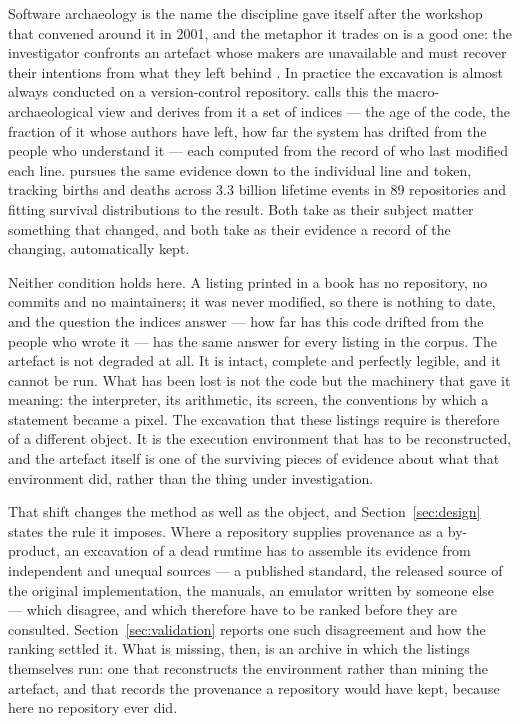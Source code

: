 Software archaeology is the name the discipline gave itself after the workshop that convened around it in 2001, and the metaphor it trades on is a good one: the investigator confronts an artefact whose makers are unavailable and must recover their intentions from what they left behind \citep{huntThomas2002}. In practice the excavation is almost always conducted on a version-control repository. \citet{robles2005} calls this the macro-archaeological view and derives from it a set of indices --- the age of the code, the fraction of it whose authors have left, how far the system has drifted from the people who understand it --- each computed from the record of who last modified each line. \citet{spinellis2021} pursues the same evidence down to the individual line and token, tracking births and deaths across 3.3 billion lifetime events in 89 repositories and fitting survival distributions to the result. Both take as their subject matter something that changed, and both take as their evidence a record of the changing, automatically kept.

Neither condition holds here. A listing printed in a book has no repository, no commits and no maintainers; it was never modified, so there is nothing to date, and the question the indices answer --- how far has this code drifted from the people who wrote it --- has the same answer for every listing in the corpus. The artefact is not degraded at all. It is intact, complete and perfectly legible, and it cannot be run. What has been lost is not the code but the machinery that gave it meaning: the interpreter, its arithmetic, its screen, the conventions by which a statement became a pixel. The excavation that these listings require is therefore of a different object. It is the execution environment that has to be reconstructed, and the artefact itself is one of the surviving pieces of evidence about what that environment did, rather than the thing under investigation.

That shift changes the method as well as the object, and Section~\ref{sec:design} states the rule it imposes. Where a repository supplies provenance as a by-product, an excavation of a dead runtime has to assemble its evidence from independent and unequal sources --- a published standard, the released source of the original implementation, the manuals, an emulator written by someone else --- which disagree, and which therefore have to be ranked before they are consulted. Section~\ref{sec:validation} reports one such disagreement and how the ranking settled it. What is missing, then, is an archive in which the listings themselves run: one that reconstructs the environment rather than mining the artefact, and that records the provenance a repository would have kept, because here no repository ever did.

